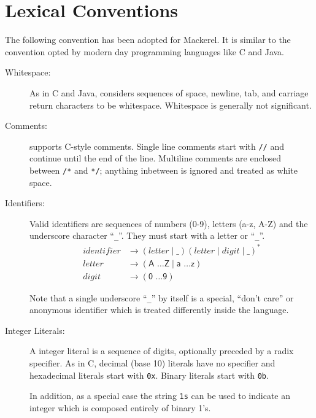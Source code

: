 \documentclass[a4paper,11pt,twoside]{report}
\begin{document}


\chapter{Lexical Conventions}\label{chap:lexical}
The following convention has been adopted for Mackerel. It is similar to
the convention opted by modern day programming languages like C and Java.\\

\begin{description}
\item[Whitespace:]  As in C and Java, \Mac considers sequences of
  space, newline, tab, and carriage return characters to be
  whitespace.  Whitespace is generally not significant. 

\item[Comments:] \Mac supports C-style comments.  Single line comments
  start with \texttt{//} and continue until the end of the line.
  Multiline comments are enclosed between \texttt{/*} and \texttt{*/};
  anything inbetween is ignored and treated as white space.

\item[Identifiers:] Valid \Mac identifiers are sequences of numbers
  (0-9), letters (a-z, A-Z) and the underscore character ``\texttt{\_}''.  They
  must start with a letter or ``\texttt{\_}''.  
  \begin{align*}
    identifier & \rightarrow ( letter \mid \_ ) (letter \mid digit \mid \_)^{\textrm{*}} \\
    letter & \rightarrow (\textsf{A \ldots Z} \mid  \textsf{a \ldots z})\\
    digit & \rightarrow (\textsf{0 \ldots 9})
\end{align*}

  Note that a single underscore ``\texttt{\_}'' by itself is a special,
  ``don't care'' or anonymous identifier which is treated differently
  inside the language. 
  
\item[Integer Literals:] A \Mac integer literal is a sequence of
  digits, optionally preceded by a radix specifier.  As in C, decimal (base 10)
  literals have no specifier and hexadecimal literals start with
  \texttt{0x}.  Binary literals start with \texttt{0b}. 

  In addition, as a special case the string \texttt{1s} can be used to
  indicate an integer which is composed entirely of binary 1's. 


\end{description}
\end{document}
